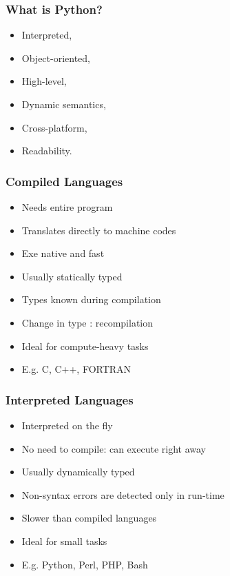 \begin{frame}[fragile]  \frametitle{What is Python?}
\begin{itemize}
\item Interpreted, 
\item Object-oriented, 
\item High-level,
\item Dynamic semantics,
\item Cross-platform,
\item Readability.
\end{itemize}
\end{frame}


\begin{frame}[fragile]  \frametitle{Compiled Languages}
\begin{itemize}
\item Needs entire program
\item Translates directly to machine codes 
\item Exe native and fast
\item Usually statically typed
\item Types known during compilation
\item Change in type : recompilation
\item Ideal for compute-heavy tasks
\item E.g. C, C++, FORTRAN
\end{itemize}
\end{frame}

\begin{frame}[fragile]  \frametitle{Interpreted Languages}
\begin{itemize}
\item  Interpreted on the fly
\item No need to compile: can execute right away
\item Usually dynamically typed
\item Non-syntax errors are detected only in run-time
\item Slower than compiled languages
\item Ideal for small tasks
\item  E.g. Python, Perl, PHP, Bash
\end{itemize}
\end{frame}

